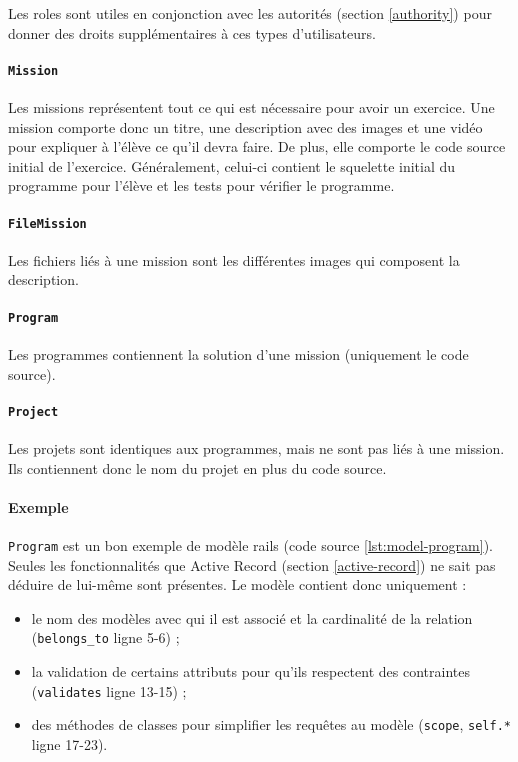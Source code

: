 Les \glspl{role} sont utiles en conjonction avec les autorités (section \ref{authority}) pour donner des droits supplémentaires à ces types d'utilisateurs.

\paragraph{\texttt{Mission}} Les \glspl{mission} représentent tout ce qui est nécessaire pour avoir un exercice. Une \gls{mission} comporte donc un titre, une description avec des images et une vidéo pour expliquer à l'élève ce qu'il devra faire. De plus, elle comporte le code source initial de l'exercice. Généralement, celui-ci contient le squelette initial du programme pour l'élève et les tests pour vérifier le programme.

\paragraph{\texttt{FileMission}} Les fichiers liés à une \gls{mission} sont les différentes images qui composent la description.

\paragraph{\texttt{Program}} Les programmes contiennent la solution d'une \gls{mission} (uniquement le code source).

\paragraph{\texttt{Project}} Les projets sont identiques aux programmes, mais ne sont pas liés à une \gls{mission}. Ils contiennent donc le nom du projet en plus du code source.

\paragraph{Exemple} \texttt{Program} est un bon exemple de modèle \gls{rails} (code source \ref{lst:model-program}). Seules les fonctionnalités que Active Record (section \ref{active-record}) ne sait pas déduire de lui-même sont présentes. Le modèle contient donc uniquement :
\begin{itemize}
  \item le nom des modèles avec qui il est associé et la cardinalité de la relation (\lstinline[language=Rails]{belongs_to} ligne 5-6) ;
  \item la validation de certains attributs pour qu'ils respectent des contraintes (\lstinline[language=Rails]{validates} ligne 13-15) ;
  \item des méthodes de classes pour simplifier les requêtes au modèle (\lstinline[language=Rails]{scope},  \lstinline[language=Rails]{self.*} ligne 17-23).
\end{itemize}

